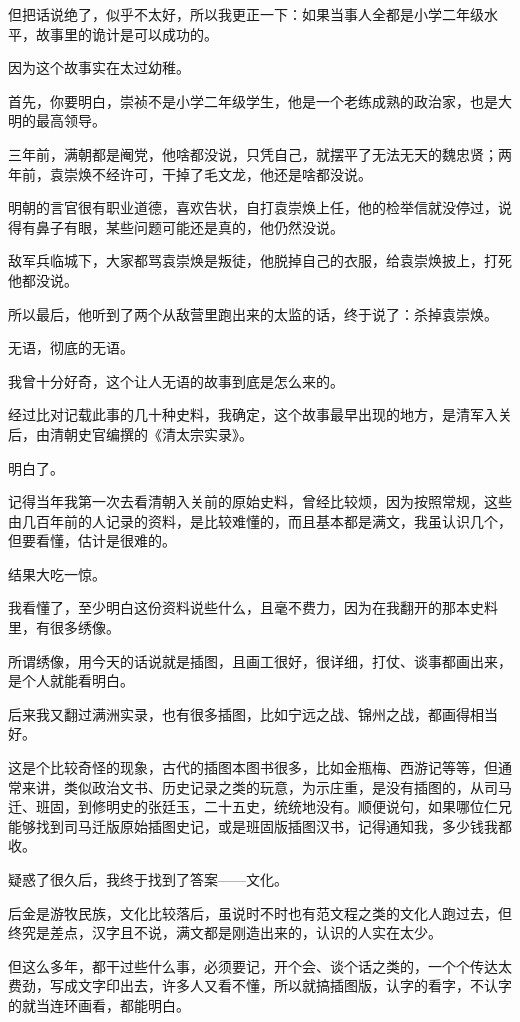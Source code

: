 \begin{multicols}{\theparacolNo}
但把话说绝了，似乎不太好，所以我更正一下：如果当事人全都是小学二年级水平，故事里的诡计是可以成功的。

因为这个故事实在太过幼稚。

首先，你要明白，崇祯不是小学二年级学生，他是一个老练成熟的政治家，也是大明的最高领导。

三年前，满朝都是阉党，他啥都没说，只凭自己，就摆平了无法无天的魏忠贤；两年前，袁崇焕不经许可，干掉了毛文龙，他还是啥都没说。

明朝的言官很有职业道德，喜欢告状，自打袁崇焕上任，他的检举信就没停过，说得有鼻子有眼，某些问题可能还是真的，他仍然没说。

敌军兵临城下，大家都骂袁崇焕是叛徒，他脱掉自己的衣服，给袁崇焕披上，打死他都没说。

所以最后，他听到了两个从敌营里跑出来的太监的话，终于说了：杀掉袁崇焕。

无语，彻底的无语。

我曾十分好奇，这个让人无语的故事到底是怎么来的。

经过比对记载此事的几十种史料，我确定，这个故事最早出现的地方，是清军入关后，由清朝史官编撰的《清太宗实录》。

明白了。

记得当年我第一次去看清朝入关前的原始史料，曾经比较烦，因为按照常规，这些由几百年前的人记录的资料，是比较难懂的，而且基本都是满文，我虽认识几个，但要看懂，估计是很难的。

结果大吃一惊。

我看懂了，至少明白这份资料说些什么，且毫不费力，因为在我翻开的那本史料里，有很多绣像。

所谓绣像，用今天的话说就是插图，且画工很好，很详细，打仗、谈事都画出来，是个人就能看明白。

后来我又翻过满洲实录，也有很多插图，比如宁远之战、锦州之战，都画得相当好。

这是个比较奇怪的现象，古代的插图本图书很多，比如金瓶梅、西游记等等，但通常来讲，类似政治文书、历史记录之类的玩意，为示庄重，是没有插图的，从司马迁、班固，到修明史的张廷玉，二十五史，统统地没有。顺便说句，如果哪位仁兄能够找到司马迁版原始插图史记，或是班固版插图汉书，记得通知我，多少钱我都收。

疑惑了很久后，我终于找到了答案——文化。

后金是游牧民族，文化比较落后，虽说时不时也有范文程之类的文化人跑过去，但终究是差点，汉字且不说，满文都是刚造出来的，认识的人实在太少。

但这么多年，都干过些什么事，必须要记，开个会、谈个话之类的，一个个传达太费劲，写成文字印出去，许多人又看不懂，所以就搞插图版，认字的看字，不认字的就当连环画看，都能明白。


\end{multicols}
